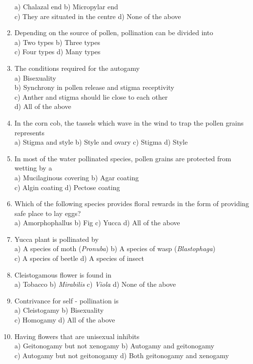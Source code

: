 \begin{enumerate}
  a) Chalazal end b) Micropylar end\\
  c) They are situated in the centre d) None of the above
\item
  Depending on the source of pollen, pollination can be divided into\\
  a) Two types b) Three types\\
  c) Four types d) Many types
\item
  The conditions required for the autogamy\\
  a) Bisexuality\\
  b) Synchrony in pollen release and stigma receptivity\\
  c) Anther and stigma should lie close to each other\\
  d) All of the above
\item
  In the corn cob, the tassels which wave in the wind to trap the pollen
  grains represents\\
  a) Stigma and style b) Style and ovary c) Stigma d) Style
\item
  In most of the water pollinated species, pollen grains are protected
  from wetting by a\\
  a) Mucilaginous covering b) Agar coating\\
  c) Algin coating d) Pectose coating
\item
  Which of the following species provides floral rewards in the form of
  providing safe place to lay eggs?\\
  a) Amorphophallus b) Fig c) Yucca d) All of the above
\item
  Yucca plant is pollinated by\\
  a) A species of moth (\emph{Pronuba}) b) A species of wasp
  (\emph{Blastophaga})\\
  c) A species of beetle d) A species of insect
\item
  Cleistogamous flower is found in\\
  a) Tobacco b) \emph{Mirabilis} c) \emph{Viola} d) None of the above
\item
  Contrivance for self - pollination is\\
  a) Cleistogamy b) Bisexuality\\
  c) Homogamy d) All of the above
\item
  Having flowers that are unisexual inhibits\\
  a) Geitonogamy but not xenogamy b) Autogamy and geitonogamy\\
  c) Autogamy but not geitonogamy d) Both geitonogamy and xenogamy

\end{enumerate}
